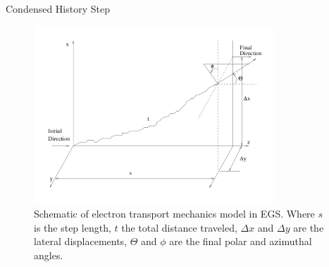 \documentclass{beamer}
\begin{document}
\begin{frame}{Condensed History Step}
  
\begin{figure}[r]
  \centering
  \includegraphics[width=90mm]{electron_step.png}
  \caption{Schematic of electron transport mechanics model in EGS. Where $s$ is the step length, $t$ the total distance traveled, $\Delta x$ and $\Delta y$ are the lateral displacements, $\Theta$ and $\phi$ are the final polar and azimuthal angles.}
\end{figure}

\end{frame}
\end{document}

